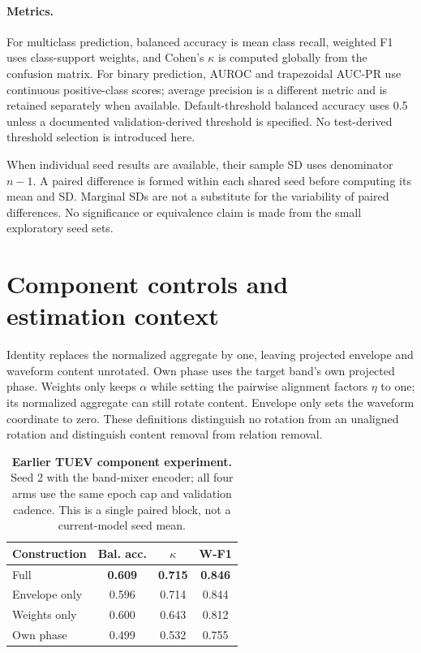 \documentclass[10pt,twocolumn,letterpaper]{article}
\newcommand{\TableStyle}{\fontsize{8}{9.5}\selectfont\setlength{\tabcolsep}{3pt}\renewcommand{\arraystretch}{1.10}}
\begin{document}
\paragraph{Metrics.}
For multiclass prediction, balanced accuracy is mean class recall,
weighted F1 uses class-support weights, and Cohen's $\kappa$ is computed
globally from the confusion matrix. For binary prediction, AUROC and
trapezoidal AUC-PR use continuous positive-class scores; average precision
is a different metric and is retained separately when available.
Default-threshold balanced accuracy uses 0.5 unless a documented
validation-derived threshold is specified. No test-derived threshold
selection is introduced here.

When individual seed results are available, their sample SD uses
denominator $n-1$. A paired difference is formed within each shared
seed before computing its mean and SD. Marginal SDs are not a substitute
for the variability of paired differences. No significance or equivalence
claim is made from the small exploratory seed sets.

\section{Component controls and estimation context}
\label{app:controls}
Identity replaces the normalized aggregate by one, leaving projected
envelope and waveform content unrotated. Own phase uses the target
band's own projected phase. Weights only keeps $\alpha$ while setting
the pairwise alignment factors $\eta$ to one; its normalized aggregate
can still rotate content. Envelope only sets the waveform coordinate to
zero. These definitions distinguish no rotation from an unaligned
rotation and distinguish content removal from relation removal.

\begin{table}[t]
\centering\TableStyle
\caption{\textbf{Earlier TUEV component experiment.} Seed 2 with the
band-mixer encoder; all four arms use the same epoch cap and validation
cadence. This is a single paired block, not a current-model seed mean.}
\label{tab:old-components}
\begin{tabular*}{\linewidth}{@{\extracolsep{\fill}}lccc@{}}
\toprule
Construction & Bal. acc. & $\kappa$ & W-F1\\
\midrule
Full & \textbf{0.609} & \textbf{0.715} & \textbf{0.846}\\
Envelope only & 0.596 & 0.714 & 0.844\\
Weights only & 0.600 & 0.643 & 0.812\\
Own phase & 0.499 & 0.532 & 0.755\\
\bottomrule
\end{tabular*}
\end{table}
\end{document}

